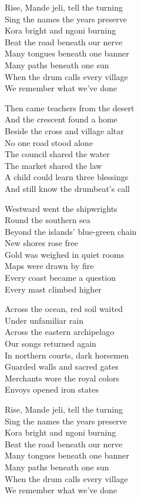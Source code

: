 \begin{lyrics}
Rise, Mande jeli, tell the turning\\
Sing the names the years preserve\\
Kora bright and ngoni burning\\
Beat the road beneath our nerve\\
Many tongues beneath one banner\\
Many paths beneath one sun\\
When the drum calls every village\\
We remember what we’ve done

Then came teachers from the desert\\
And the crescent found a home\\
Beside the cross and village altar\\
No one road stood alone\\
The council shared the water\\
The market shared the law\\
A child could learn three blessings\\
And still know the drumbeat’s call

Westward went the shipwrights\\
Round the southern sea\\
Beyond the islands’ blue-green chain\\
New shores rose free\\
Gold was weighed in quiet rooms\\
Maps were drawn by fire\\
Every coast became a question\\
Every mast climbed higher

Across the ocean, red soil waited\\
Under unfamiliar rain\\
Across the eastern archipelago\\
Our songs returned again\\
In northern courts, dark horsemen\\
Guarded walls and sacred gates\\
Merchants wore the royal colors\\
Envoys opened iron states

Rise, Mande jeli, tell the turning\\
Sing the names the years preserve\\
Kora bright and ngoni burning\\
Beat the road beneath our nerve\\
Many tongues beneath one banner\\
Many paths beneath one sun\\
When the drum calls every village\\
We remember what we’ve done


\end{lyrics}
